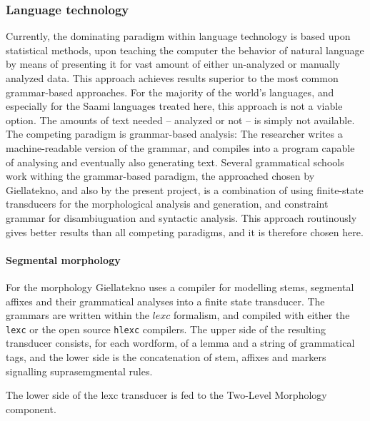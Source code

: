 \documentclass[a4paper,12pt]{article}
\begin{document}
\subsubsection{Language technology} %
Currently, the dominating paradigm within language technology is based upon statistical methods, upon teaching the computer the behavior of natural language by means of presenting it for vast amount of either un-analyzed or manually analyzed data. This approach achieves results superior to the most common grammar-based approaches. For the majority of the world's languages, and especially for the Saami languages treated here, this approach is not a viable option. The amounts of text needed – analyzed or not – is simply not available. The competing paradigm is grammar-based analysis: The researcher writes a machine-readable version of the grammar, and compiles into a program capable of analysing and eventually also generating text. Several grammatical schools work withing the grammar-based paradigm, the approached chosen by Giellatekno, and also by the present project, is a combination of using finite-state transducers for the morphological analysis and generation, and constraint grammar for disambiuguation and syntactic analysis. This approach routinously gives better results than all competing paradigms, and it is therefore chosen here. %

\paragraph{Segmental morphology}

For the morphology Giellatekno uses a compiler for modelling stems, segmental affixes and their grammatical analyses into a finite state transducer. The grammars are written within the $lexc$ formalism, and compiled with either the \texttt{lexc} or the open source \texttt{hlexc} compilers. The upper side of the resulting transducer consists, for each wordform, of a lemma and a string of grammatical tags, and the lower side is the concatenation of stem, affixes and markers signalling suprasemgmental rules.

The lower side of the lexc transducer is fed to the Two-Level Morphology component.
\end{document}
